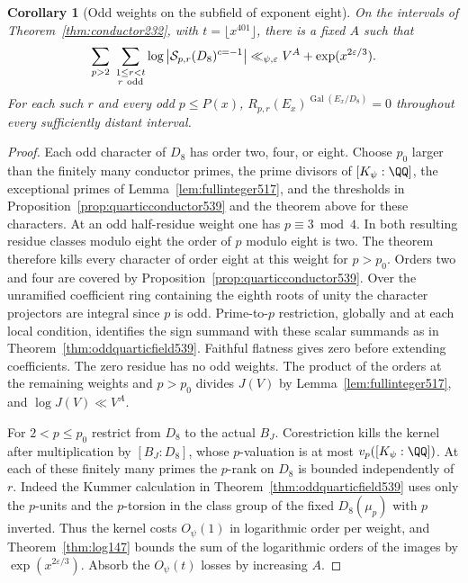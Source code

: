\documentclass[a4paper,11pt]{article}
\newtheorem{corollary}[proposition]{Corollary}
\theoremstyle{definition}
\theoremstyle{remark}
\numberwithin{equation}{section}
\begin{document}
\begin{corollary}[Odd weights on the subfield of exponent eight]
\leavevmode\label{cor:octicspectrum543}
On the intervals of Theorem~\ref{thm:conductor232}, with
\(t=\lfloor x^{401}\rfloor\), there is a fixed \(A\) such that
\[
     \sum_{p>2}\ \sum_{\substack{1\le r<t\\r\ {\rm odd}}}
       \log\big|\mathcal S_{p,r}(D_8)^{c=-1}\big|
       \ll_{\psi,\varepsilon} V^A+\exp(x^{2\varepsilon/3}).
\]
For each such \(r\) and every odd \(p\le P(x)\),
\(R_{p,r}(E_x)^{\operatorname{Gal}(E_x/D_8)}=0\)
throughout every sufficiently distant interval.
\end{corollary}
\begin{proof}
Each odd character of \(D_8\) has order two, four, or eight.
Choose \(p_0\) larger than the finitely many conductor primes,
the prime divisors of \([K_\psi:\QQ]\), the exceptional primes
of Lemma~\ref{lem:fullinteger517}, and the thresholds in
Proposition~\ref{prop:quarticconductor539} and the theorem
above for these characters. At an odd half-residue weight
one has \(p\equiv3\bmod4\). In both resulting residue classes
modulo eight the order of \(p\) modulo eight is two.
The theorem therefore kills every character of order eight
at this weight for \(p>p_0\). Orders two and four are covered
by Proposition~\ref{prop:quarticconductor539}. Over the
unramified coefficient ring containing the eighth roots of
unity the character projectors are integral since \(p\) is
odd. Prime-to-\(p\) restriction, globally and at each local
condition, identifies the sign summand with these scalar
summands as in Theorem~\ref{thm:oddquarticfield539}. Faithful
flatness gives zero before extending coefficients. The zero
residue has no odd weights. The product of the orders at
the remaining weights and \(p>p_0\) divides \(J(V)\) by
Lemma~\ref{lem:fullinteger517}, and \(\log J(V)\ll V^A\).

For \(2<p\le p_0\) restrict from \(D_8\) to the actual
\(B_J\). Corestriction kills the kernel after multiplication
by \([B_J:D_8]\), whose \(p\)-valuation is at most
\(v_p([K_\psi:\QQ])\). At each of these finitely many primes
the \(p\)-rank on \(D_8\) is bounded independently of \(r\).
Indeed the Kummer calculation in Theorem~\ref{thm:oddquarticfield539}
uses only the \(p\)-units and the \(p\)-torsion in the class
group of the fixed \(D_8(\mu_p)\) with \(p\) inverted.
Thus the kernel costs \(O_\psi(1)\) in logarithmic order per
weight, and Theorem~\ref{thm:log147} bounds the sum of the
logarithmic orders of the images by \(\exp(x^{2\varepsilon/3})\).
Absorb the \(O_\psi(t)\) losses by increasing \(A\).


\end{proof}
\end{document}

